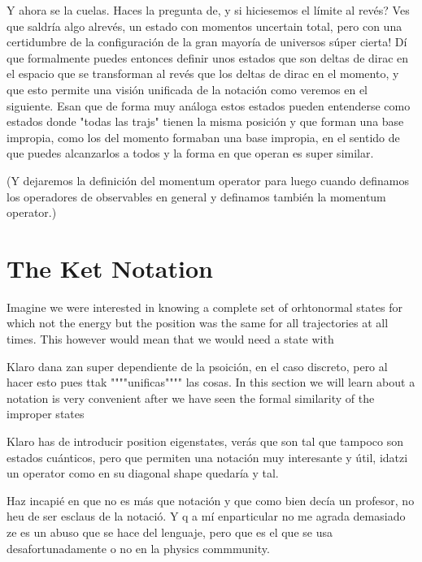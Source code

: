 \documentclass[11pt, a4paper]{article} %
\begin{document}
Y ahora se la cuelas. Haces la pregunta de, y si hiciesemos el límite al revés? Ves que saldría algo alrevés, un estado con momentos uncertain total, pero con una certidumbre de la configuración de la gran mayoría de universos súper cierta! Dí que formalmente puedes entonces definir unos estados que son deltas de dirac en el espacio que se transforman al revés que los deltas de dirac en el momento, y que esto permite una visión unificada de la notación como veremos en el siguiente.
Esan que de forma muy análoga estos estados pueden entenderse como estados donde "todas las trajs" tienen la misma posición y que forman una base impropia, como los del momento formaban una base impropia, en el sentido de que puedes alcanzarlos a todos y la forma en que operan es super similar.

(Y dejaremos la definición del momentum operator para luego cuando definamos los operadores de observables en general y definamos también la momentum operator.)

\section*{The Ket Notation }
Imagine we were interested in knowing a complete set of orhtonormal states for which not the energy but the position was the same for all trajectories at all times. This however would mean that we would need a state with 

Klaro dana zan super dependiente de la psoición, en el caso discreto, pero al hacer esto pues ttak """"unificas"""" las cosas.
In this section we will learn about a notation is very convenient after we have seen the formal similarity of the improper states

Klaro has de introducir position eigenstates, verás que son tal que tampoco son estados cuánticos, pero que permiten una notación muy interesante y útil, idatzi un operator como en su diagonal shape quedaría y tal.

Haz incapié en que no es más que notación y que como bien decía un profesor, no heu de ser esclaus de la notació. Y q a mí enparticular no me agrada demasiado ze es un abuso que se hace del lenguaje, pero que es el que se usa desafortunadamente o no en la physics commmunity.
\end{document}
